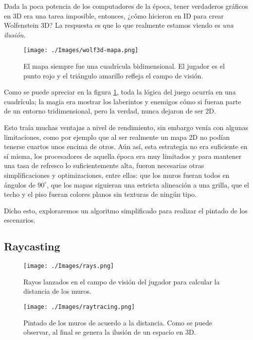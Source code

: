 Dada la poca potencia de los computadores de la época, tener verdaderos gráficos en 3D era una tarea imposible, entonces, ¿cómo hicieron en ID para crear Wolfenstein 3D? La respuesta es que lo que realmente estamos viendo es \emph{una ilusión}.

\begin{figure}[h!]
	\centering
	\texttt{[image: ./Images/wolf3d-mapa.png]}
	\caption{El mapa siempre fue una cuadrícula bidimensional. El jugador es el punto rojo y el triángulo amarillo refleja el campo de visión.}
	\label{wolf3d-mapa}
\end{figure}

Como se puede apreciar en la figura \ref{wolf3d-mapa}, toda la lógica del juego ocurría en una cuadrícula; la magia era mostrar los laberintos y enemigos cómo si fueran parte de un entorno tridimensional, pero la verdad, nunca dejaron de ser 2D.

Esto traía muchas ventajas a nivel de rendimiento, sin embargo venía con algunas limitaciones, como por ejemplo que al ser realmente un mapa 2D no podían tenerse cuartos unos encima de otros. Aún así, esta estrategia no era suficiente en sí misma, los procesadores de aquella época era muy limitados y para mantener una tasa de refresco lo suficientemente alta, fueron necesarias otras simplificaciones y optimizaciones, entre ellas: que los muros fueran todos en ángulos de $90^{\circ}$, que los mapas siguieran una estricta alineación a una grilla, que el techo y el piso fueran colores planos sin texturas de ningún tipo.

Dicho esto, exploraremos un algoritmo simplificado para realizar el pintado de los escenarios.

\newpage
\subsection{Raycasting}

\begin{wrapfigure}{r}{0.4\textwidth}
	\begin{center}
		\texttt{[image: ./Images/rays.png]}
	\end{center}	
	\caption{Rayos lanzados en el campo de visión del jugador para calcular la distancia de los muros. \newline \newline}
	\label{rays}
	
	\begin{center}
		\texttt{[image: ./Images/raytracing.png]}
	\end{center}	
	\caption{Pintado de los muros de acuerdo a la distancia. Como se puede observar, al final se genera la ilusión de un espacio en 3D. \newline \newline}
	\label{raytracing}
\end{wrapfigure}


